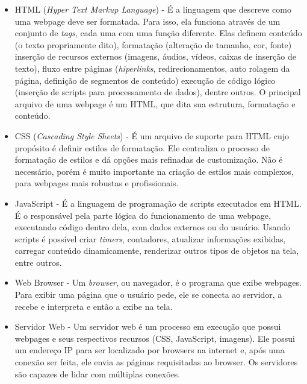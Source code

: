 \documentclass[a4paper,12pt]{article}
\begin{document}
\begin{itemize}
    \item HTML (\emph{Hyper Text Markup Language}) - É a linguagem que descreve como uma webpage deve ser formatada. Para isso, ela funciona através de um conjunto de \emph{tags}, cada uma com uma função diferente. Elas definem conteúdo (o texto propriamente dito), formatação (alteração de tamanho, cor, fonte) inserção de recursos externos (imagens, áudios, vídeos, caixas de inserção de texto), fluxo entre páginas (\emph{hiperlinks}, redirecionamentos, auto rolagem da página, definição de segmentos de conteúdo) execução de código lógico (inserção de scripts para processamento de dados), dentre outros. O principal arquivo de uma webpage é um HTML, que dita sua estrutura, formatação e conteúdo.

    \item CSS (\emph{Cascading Style Sheets}) - É um arquivo de suporte para HTML cujo propósito é definir estilos de formatação. Ele centraliza o processo de formatação de estilos e dá opções mais refinadas de customização. Não é necessário, porém é muito importante na criação de estilos mais complexos, para webpages mais robustas e profissionais.

    \item JavaScript - É a linguagem de programação de scripts executados em HTML. É o responsável pela parte lógica do funcionamento de uma webpage, executando código dentro dela, com dados externos ou do usuário. Usando scripts é possível criar \emph{timers}, contadores, atualizar informações exibidas, carregar conteúdo dinamicamente, renderizar outros tipos de objetos na tela, entre outros. %

    \item Web Browser - Um \emph{browser}, ou navegador, é o programa que exibe webpages. Para exibir uma página que o usuário pede, ele se conecta ao servidor, a recebe e interpreta e então a exibe na tela.

    \item Servidor Web - Um servidor web é um processo em execução que possui webpages e seus respectivos recursos (CSS, JavaScript, imagens). Ele possui um endereço IP para ser localizado por browsers na internet e, após uma conexão ser feita, ele envia as páginas requisitadas ao browser. Os servidores são capazes de lidar com múltiplas conexões.

\end{itemize}
\end{document}
